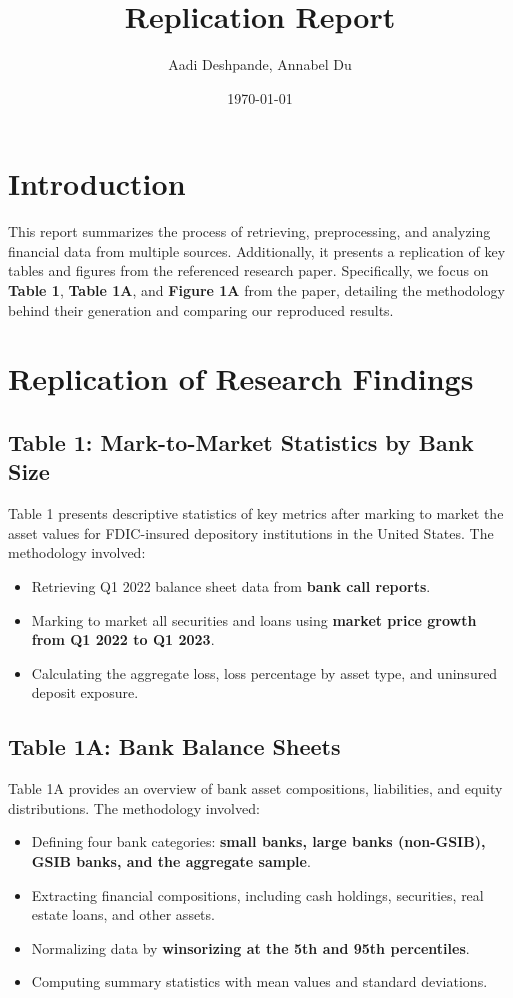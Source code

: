 \documentclass{article}
\title{Replication Report}
\author{Aadi Deshpande, Annabel Du}
\date{\today}
\begin{document}
\maketitle

\section{Introduction}
This report summarizes the process of retrieving, preprocessing, and analyzing financial data from multiple sources. Additionally, it presents a replication of key tables and figures from the referenced research paper. Specifically, we focus on \textbf{Table 1}, \textbf{Table 1A}, and \textbf{Figure 1A} from the paper, detailing the methodology behind their generation and comparing our reproduced results.

\section{Replication of Research Findings}

\subsection{Table 1: Mark-to-Market Statistics by Bank Size}
Table 1 presents descriptive statistics of key metrics after marking to market the asset values for FDIC-insured depository institutions in the United States. The methodology involved:

\begin{itemize}
    \item Retrieving Q1 2022 balance sheet data from \textbf{bank call reports}.
    \item Marking to market all securities and loans using \textbf{market price growth from Q1 2022 to Q1 2023}.
    \item Calculating the aggregate loss, loss percentage by asset type, and uninsured deposit exposure.
\end{itemize}

\subsection{Table 1A: Bank Balance Sheets}
Table 1A provides an overview of bank asset compositions, liabilities, and equity distributions. The methodology involved:

\begin{itemize}
    \item Defining four bank categories: \textbf{small banks, large banks (non-GSIB), GSIB banks, and the aggregate sample}.
    \item Extracting financial compositions, including cash holdings, securities, real estate loans, and other assets.
    \item Normalizing data by \textbf{winsorizing at the 5th and 95th percentiles}.
    \item Computing summary statistics with mean values and standard deviations.
\end{itemize}
\end{document}
